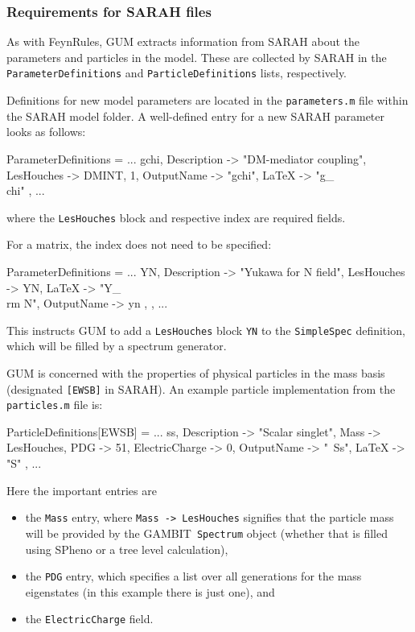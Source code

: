 \documentclass[pdftex,twocolumn,epjc3_preprint,runningheads]{svjour3}
\renewcommand{\_}{\discretionary{\underscore}{}{\underscore}}
\newcommand\cpp[1]{{\lstinline!#1!}}  %
\newcommand\term[1]{{\lstset{style=terminal}\lstinline!#1!\lstset{style=cpp}}}
\newcommand\mathematica[1]{{\lstset{style=Mathematica}\lstinline!#1!\lstset{style=cpp}}}
\newcommand{\gambit}{\textsf{GAMBIT}\xspace}
\newcommand{\GB}{\gambit}
\newcommand{\gum}{\textsf{GUM}\xspace}
\newcommand{\fr}{\textsf{FeynRules}\xspace}
\newcommand{\sarah}{\textsf{SARAH}\xspace}
\newcommand{\spheno}{\textsf{SPheno}\xspace}
\begin{document}
\subsubsection{Requirements for \sarah files} \label{sec:sarah_params}

As with \fr, \gum extracts information from \sarah about the parameters and particles in the model. These are collected by \sarah in the \mathematica{ParameterDefinitions} and \mathematica{ParticleDefinitions} lists, respectively.

Definitions for new model parameters are located in the \term{parameters.m} file within the \sarah model folder. A well-defined entry for a new \sarah parameter looks as follows:
%
\begin{lstmathematica}
ParameterDefinitions = {
  ...
  {gchi,
    {
      Description -> "DM-mediator coupling",
      LesHouches  -> {DMINT, 1},
      OutputName  -> "gchi",
      LaTeX       -> "g_\\chi"
    }
  },
  ...
}
\end{lstmathematica}
%
where the \mathematica{LesHouches} block and respective index are required fields.

For a matrix, the index does not need to be specified:
%
\begin{lstmathematica}
ParameterDefinitions = {
  ...
  {YN,
    {
      Description -> "Yukawa for N field",
      LesHouches  -> YN,
      LaTeX       -> "Y_{\\rm N}",
      OutputName  -> yn
    },
  },
  ...
}
\end{lstmathematica}
%
This instructs \gum to add a \mathematica{LesHouches} block \mathematica{YN} to the \cpp{SimpleSpec} definition, which will be filled by a spectrum generator.

\gum is concerned with the properties of physical particles in the mass basis (designated \mathematica{[EWSB]} in \sarah). An example particle implementation from the \term{particles.m} file is:
%
\begin{lstmathematica}
ParticleDefinitions[EWSB] = {
  ...
  {ss,
    {
      Description    -> "Scalar singlet",
      Mass           -> LesHouches,
      PDG            -> {51},
      ElectricCharge -> 0,
      OutputName     -> "~Ss",
      LaTeX          -> "S"
    }
  },
  ...
}
\end{lstmathematica}
%
Here the important entries are\begin{itemize}
\item the \mathematica{Mass} entry, where \mathematica{Mass -> LesHouches} signifies that the particle mass will be provided by the \GB\ \cpp{Spectrum} object (whether that is filled using \spheno or a tree level calculation),
\item the \mathematica{PDG} entry, which specifies a list over all generations for the mass eigenstates (in this example there is just one), and
\item the \mathematica{ElectricCharge} field.
\end{itemize}
\end{document}
